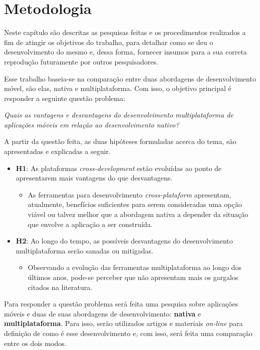 \chapter{Metodologia} \label{cap:metodologia}
Neste capítulo são descritas as pesquisas feitas e os procedimentos realizados a 
fim de atingir os objetivos do trabalho, para detalhar como se deu o desenvolvimento do mesmo e, 
dessa forma, fornecer insumos para a sua correta reprodução futuramente por outros pesquisadores.

Esse trabalho baseia-se na comparação entre duas abordagens de desenvolvimento móvel, são elas, nativa e multiplataforma. 
Com isso, o objetivo principal é responder a seguinte questão problema:
\begin{center}
    \textit{Quais as vantagens e desvantagens do desenvolvimento multiplataforma de aplicações móveis em relação ao desenvolvimento nativo?}
\end{center}

A partir da questão feita, as duas hipóteses formuladas acerca do tema, são apresentadas e explicadas a seguir.

\begin{itemize}
    \item \textbf{H1}: As plataformas \textit{cross-development} estão evoluídas ao ponto de apresentarem mais vantagens do que desvantagens.
        \begin{itemize}
            \item As ferramentas para desenvolvimento \textit{cross-plataform} apresentam, atualmente, benefícios suficientes para serem consideradas uma opção viável ou talvez melhor que a abordagem nativa
            a depender da situação que envolve a aplicação a ser construída. 
        \end{itemize}
    \item \textbf{H2}: Ao longo do tempo, as possíveis desvantagens do desenvolvimento multiplataforma serão sanadas ou mitigadas.
        \begin{itemize}
            \item Observando a evolução das ferramentas multiplataforma ao longo dos últimos anos, pode-se perceber que não apresentam mais os gargalos citados na literatura.
        \end{itemize}
\end{itemize}

Para responder a questão problema será feita uma pesquisa sobre aplicações móveis e duas de suas abordagens de desenvolvimento: \textbf{nativa} e \textbf{multiplataforma}.
Para isso, serão utilizados artigos e materiais \textit{on-line} para definição de como é esse desenvolvimento e, com isso, será feita uma comparação entre os dois modos. 

